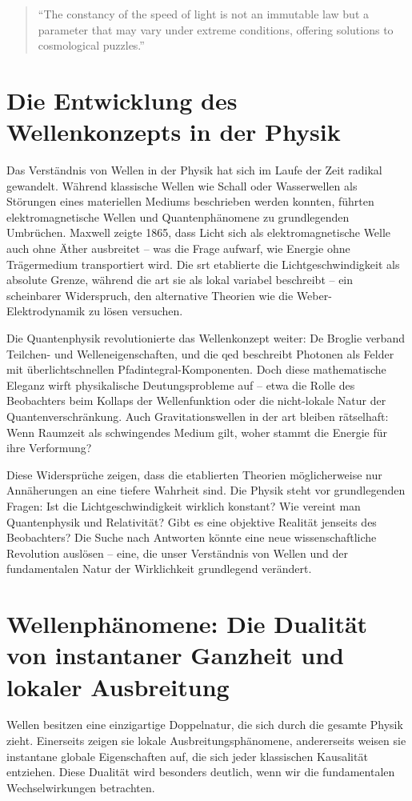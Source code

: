 \begin{quote}
    \enquote{The constancy of the speed of light is not an immutable law but a parameter that may vary under extreme conditions, offering solutions to cosmological puzzles.} \cite{Magueijo2003}
\end{quote}

\section{Die Entwicklung des Wellenkonzepts in der Physik}
Das Verständnis von Wellen in der Physik hat sich im Laufe der Zeit radikal gewandelt. Während klassische Wellen wie Schall oder Wasserwellen als Störungen eines materiellen Mediums
beschrieben werden konnten, führten elektromagnetische Wellen und Quantenphänomene zu grundlegenden Umbrüchen. Maxwell zeigte 1865, dass Licht sich als elektromagnetische Welle
auch ohne Äther ausbreitet – was die Frage aufwarf, wie Energie ohne Trägermedium transportiert wird. Die \gls{srt} etablierte die Lichtgeschwindigkeit
als absolute Grenze, während die \gls{art} sie als lokal variabel beschreibt – ein scheinbarer Widerspruch, den alternative Theorien wie die Weber-Elektrodynamik
zu lösen versuchen.

Die Quantenphysik revolutionierte das Wellenkonzept weiter: De Broglie verband Teilchen- und Welleneigenschaften, und die \gls{qed} beschreibt Photonen als Felder mit überlichtschnellen
Pfadintegral-Komponenten. Doch diese mathematische Eleganz wirft physikalische Deutungsprobleme auf – etwa die Rolle des Beobachters beim Kollaps der Wellenfunktion oder die nicht-lokale
Natur der Quantenverschränkung. Auch Gravitationswellen in der \gls{art} bleiben rätselhaft: Wenn Raumzeit als schwingendes Medium gilt, woher stammt die Energie für ihre Verformung?

Diese Widersprüche zeigen, dass die etablierten Theorien möglicherweise nur Annäherungen an eine tiefere Wahrheit sind. Die Physik steht vor grundlegenden Fragen: Ist die Lichtgeschwindigkeit
wirklich konstant? Wie vereint man Quantenphysik und Relativität? Gibt es eine objektive Realität jenseits des Beobachters? Die Suche nach Antworten könnte eine neue wissenschaftliche
Revolution auslösen – eine, die unser Verständnis von Wellen und der fundamentalen Natur der Wirklichkeit grundlegend verändert.

\section{Wellenphänomene: Die Dualität von instantaner Ganzheit und lokaler Ausbreitung}
Wellen besitzen eine einzigartige Doppelnatur, die sich durch die gesamte Physik zieht. Einerseits zeigen sie lokale Ausbreitungsphänomene, andererseits weisen sie instantane globale
Eigenschaften auf, die sich jeder klassischen Kausalität entziehen. Diese Dualität wird besonders deutlich, wenn wir die fundamentalen Wechselwirkungen betrachten.

